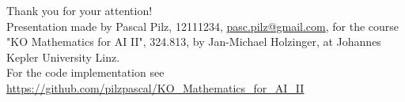 \documentclass{beamer}
\begin{document}
\begin{frame}
    Thank you for your attention!\\
    \vspace{10mm}
    Presentation made by Pascal Pilz, 12111234, \href{mailto:pasc.pilz@gmail.com}{pasc.pilz@gmail.com}, for the course "KO Mathematics for AI II", 324.813, by Jan-Michael Holzinger, at Johannes Kepler University Linz.\\ \vspace{10mm}
    For the code implementation see \url{https://github.com/pilzpascal/KO_Mathematics_for_AI_II}
\end{frame}
\end{document}
